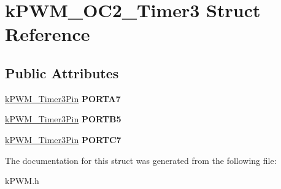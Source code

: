 \hypertarget{structkPWM__OC2__Timer3}{}\section{k\+P\+W\+M\+\_\+\+O\+C2\+\_\+\+Timer3 Struct Reference}
\label{structkPWM__OC2__Timer3}
\subsection*{Public Attributes}
\begin{DoxyCompactItemize}
\item 
\hyperlink{structkPWM__Timer3Pin}{k\+P\+W\+M\+\_\+\+Timer3\+Pin} {\bfseries P\+O\+R\+T\+A7}\hypertarget{structkPWM__OC2__Timer3_a5275acf86aff80ba301c7ef653b28cbd}{}\label{structkPWM__OC2__Timer3_a5275acf86aff80ba301c7ef653b28cbd}

\item 
\hyperlink{structkPWM__Timer3Pin}{k\+P\+W\+M\+\_\+\+Timer3\+Pin} {\bfseries P\+O\+R\+T\+B5}\hypertarget{structkPWM__OC2__Timer3_af87ab6c0e540fe63488030e5a6d87614}{}\label{structkPWM__OC2__Timer3_af87ab6c0e540fe63488030e5a6d87614}

\item 
\hyperlink{structkPWM__Timer3Pin}{k\+P\+W\+M\+\_\+\+Timer3\+Pin} {\bfseries P\+O\+R\+T\+C7}\hypertarget{structkPWM__OC2__Timer3_aa17589b411aeb913ac3367c5f4ee119d}{}\label{structkPWM__OC2__Timer3_aa17589b411aeb913ac3367c5f4ee119d}

\end{DoxyCompactItemize}


The documentation for this struct was generated from the following file\+:\begin{DoxyCompactItemize}
\item 
k\+P\+W\+M.\+h\end{DoxyCompactItemize}
